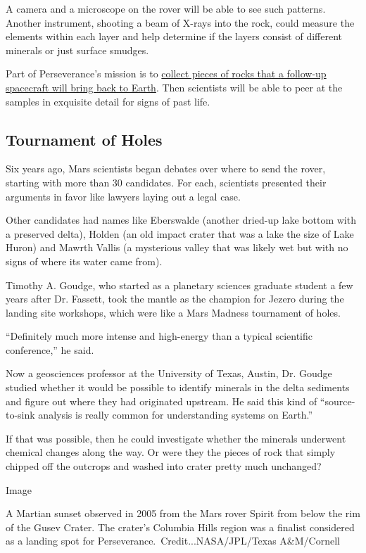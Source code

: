 A camera and a microscope on the rover will be able to see such
patterns. Another instrument, shooting a beam of X-rays into the rock,
could measure the elements within each layer and help determine if the
layers consist of different minerals or just surface smudges.

Part of Perseverance's mission is to
\href{https://www.nytimes.com/2020/07/28/science/mars-sample-return-mission.html}{collect
pieces of rocks that a follow-up spacecraft will bring back to Earth}.
Then scientists will be able to peer at the samples in exquisite detail
for signs of past life.

\hypertarget{tournament-of-holes}{%
\subsection{Tournament of Holes}\label{tournament-of-holes}}

Six years ago, Mars scientists began debates over where to send the
rover, starting with more than 30 candidates. For each, scientists
presented their arguments in favor like lawyers laying out a legal case.

Other candidates had names like Eberswalde (another dried-up lake bottom
with a preserved delta), Holden (an old impact crater that was a lake
the size of Lake Huron) and Mawrth Vallis (a mysterious valley that was
likely wet but with no signs of where its water came from).

Timothy A. Goudge, who started as a planetary sciences graduate student
a few years after Dr. Fassett, took the mantle as the champion for
Jezero during the landing site workshops, which were like a Mars Madness
tournament of holes.

``Definitely much more intense and high-energy than a typical scientific
conference,'' he said.

Now a geosciences professor at the University of Texas, Austin, Dr.
Goudge studied whether it would be possible to identify minerals in the
delta sediments and figure out where they had originated upstream. He
said this kind of ``source-to-sink analysis is really common for
understanding systems on Earth.''

If that was possible, then he could investigate whether the minerals
underwent chemical changes along the way. Or were they the pieces of
rock that simply chipped off the outcrops and washed into crater pretty
much unchanged?

Image

A Martian sunset observed in 2005 from the Mars rover Spirit from below
the rim of the Gusev Crater. The crater's Columbia Hills region was a
finalist considered as a landing spot for
Perseverance.~Credit...NASA/JPL/Texas A\&M/Cornell

